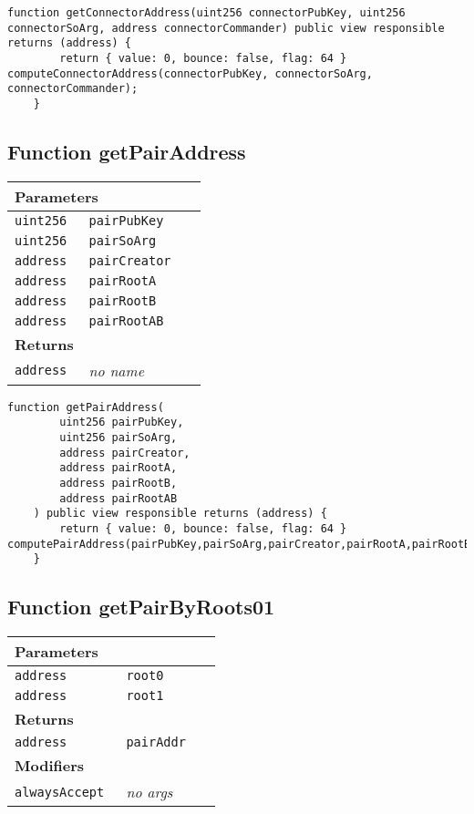 \vspace{2cm}

\begin{lstlisting}[firstnumber=233]
	function getConnectorAddress(uint256 connectorPubKey, uint256 connectorSoArg, address connectorCommander) public view responsible returns (address) {
		return { value: 0, bounce: false, flag: 64 } computeConnectorAddress(connectorPubKey, connectorSoArg, connectorCommander);
	}
\end{lstlisting}

\subsection{Function getPairAddress}


\ifsoltables
\noindent\begin{tabular}{|l|l|p{5cm}|}\hline
\multicolumn{3}{|l|}{\bf Parameters}\\\hline
\tt uint256 & \tt pairPubKey &\\\hline
\tt uint256 & \tt pairSoArg &\\\hline
\tt address & \tt pairCreator &\\\hline
\tt address & \tt pairRootA &\\\hline
\tt address & \tt pairRootB &\\\hline
\tt address & \tt pairRootAB &\\\hline
\multicolumn{3}{|l|}{\bf Returns}\\\hline
\tt address & {\em no name} &\\\hline
\end{tabular}
\fi

\vspace{2cm}

\begin{lstlisting}[firstnumber=171]
	function getPairAddress(
		uint256 pairPubKey,
		uint256 pairSoArg,
		address pairCreator,
		address pairRootA,
		address pairRootB,
		address pairRootAB
	) public view responsible returns (address) {
		return { value: 0, bounce: false, flag: 64 } computePairAddress(pairPubKey,pairSoArg,pairCreator,pairRootA,pairRootB,pairRootAB);
	}
\end{lstlisting}

\subsection{Function getPairByRoots01}


\ifsoltables
\noindent\begin{tabular}{|l|l|p{5cm}|}\hline
\multicolumn{3}{|l|}{\bf Parameters}\\\hline
\tt address & \tt root0 &\\\hline
\tt address & \tt root1 &\\\hline
\multicolumn{3}{|l|}{\bf Returns}\\\hline
\tt address & \tt pairAddr &\\\hline
\multicolumn{3}{|l|}{\bf Modifiers}\\\hline
\tt alwaysAccept & {\em no args} &\\\hline
\end{tabular}
\fi

